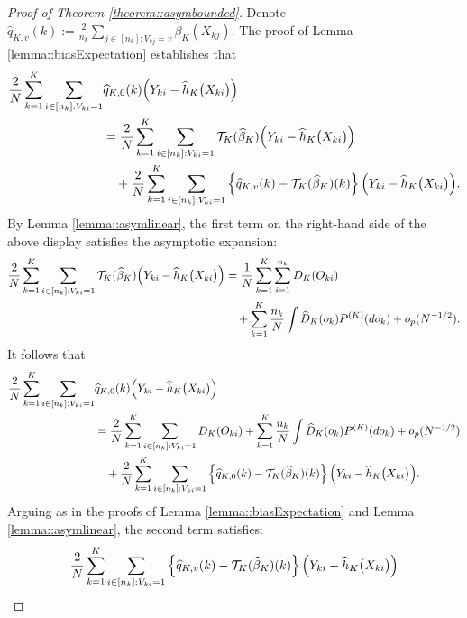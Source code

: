 \documentclass[11pt]{article}
\theoremstyle{plain}
\theoremstyle{definition}
\theoremstyle{remark}
\theoremstyle{definition}
\begin{document}
\begin{proof}[Proof of Theorem  \ref{theorem::asymbounded}]

Denote $\widehat{q}_{K,v}(k) := \frac{2}{n_k}  \sum_{j \in [n_k]:  V_{kj} = v} \widehat{\beta}_K(X_{kj})$. The proof of Lemma \ref{lemma::biasExpectation} establishes that
    \begin{align*}
         \frac{2}{N}  \sum_{k=1}^K \sum_{i \in [n_k]: V_{ki} = 1} & \widehat{q}_{K,0}(k) \Bigl(Y_{ki} - \widehat{h}_K\bigl(X_{ki}\bigr)\Bigr)\\
         &=  \frac{2}{N}   \sum_{k=1}^K \sum_{i \in [n_k]: V_{ki} = 1}  \mathcal{T}_{K}(\widehat{\beta}_K) \Bigl(Y_{ki} - \widehat{h}_K\bigl(X_{ki}\bigr)\Bigr) \\
         & \quad +  \frac{2}{N}   \sum_{k=1}^K \sum_{i \in [n_k]: V_{ki} = 1}  \left\{\widehat{q}_{K,v}(k) - \mathcal{T}_{K}(\widehat{\beta}_K)(k)\right\} \Bigl(Y_{ki} - \widehat{h}_K\bigl(X_{ki}\bigr)\Bigr).
\end{align*} 
By Lemma \ref{lemma::asymlinear}, the first term on the right-hand side of the above display satisfies the asymptotic expansion:
  \begin{align*}
      \frac{2}{N}   \sum_{k=1}^K \sum_{i \in [n_k]: V_{ki} = 1}  \mathcal{T}_{K}(\widehat{\beta}_K) \Bigl(Y_{ki} - \widehat{h}_K\bigl(X_{ki}\bigr)\Bigr)  &=    \frac{1}{N}   \sum_{k=1}^K \sum_{i=1}^{n_k} D_K(O_{ki}) \\
      & \quad +  \sum_{k=1}^K  \frac{n_k}{N} \int  \widehat{D}_K(o_k)  P^{(K)}(do_k) + o_p(N^{-1/2}).
  \end{align*}  
It follows that
   \begin{align*}
         \frac{2}{N}  \sum_{k=1}^K \sum_{i \in [n_k]: V_{ki} = 1} & \widehat{q}_{K,0}(k) \Bigl(Y_{ki} - \widehat{h}_K\bigl(X_{ki}\bigr)\Bigr)\\
         &=  \frac{2}{N}   \sum_{k=1}^K \sum_{i \in [n_k]: V_{ki} = 1} D_K(O_{ki}) + \sum_{k=1}^K  \frac{n_k}{N} \int  \widehat{D}_K(o_k)  P^{(K)}(do_k) + o_p(N^{-1/2}) \\
         & \quad +  \frac{2}{N}   \sum_{k=1}^K \sum_{i \in [n_k]: V_{ki} = 1}  \left\{\widehat{q}_{K,0}(k) - \mathcal{T}_{K}(\widehat{\beta}_K)(k)\right\} \Bigl(Y_{ki} - \widehat{h}_K\bigl(X_{ki}\bigr)\Bigr).
\end{align*} 
Arguing as in the proofs of Lemma \ref{lemma::biasExpectation} and Lemma \ref{lemma::asymlinear},  the second term satisfies:
\begin{align*}
    \frac{2}{N}   \sum_{k=1}^K \sum_{i \in [n_k]: V_{ki} = 1} &   \left\{\widehat{q}_{K,v}(k)  - \mathcal{T}_{K}(\widehat{\beta}_K)(k)\right\} \Bigl(Y_{ki} - \widehat{h}_K\bigl(X_{ki}\bigr)\Bigr) \\

\end{align*}
\end{proof}
\end{document}
